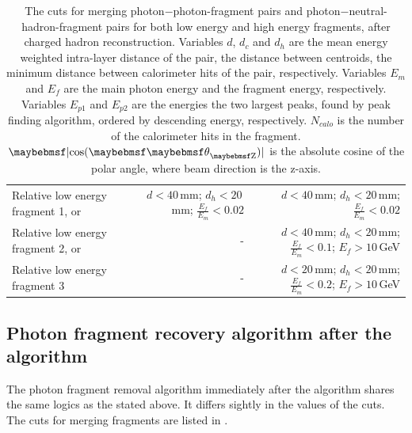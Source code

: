 \begin{table}[htbp]
\begin{tabular}{l  r  r }
\multicolumn{1}{L{0.3\textwidth}}{Relative low energy fragment 1, or} & \multicolumn{1}{R{0.3\textwidth}}{$d < 40$\,mm; $d_h < 20$\,mm; $\frac{E_f}{E_m} < 0.02$} & \multicolumn{1}{R{0.3\textwidth}}{$d < 40$\,mm; $d_h < 20$\,mm; $\frac{E_f}{E_m} < 0.02$} \\
\multicolumn{1}{L{0.3\textwidth}}{Relative low energy fragment 2, or} & \multicolumn{1}{R{0.3\textwidth}}{-}  & \multicolumn{1}{R{0.3\textwidth}}{$d < 40$\,mm; $d_h < 20$\,mm; $\frac{E_f}{E_m} < 0.1$; $E_f > 10$\,GeV} \\
\multicolumn{1}{L{0.3\textwidth}}{Relative low energy fragment 3} & \multicolumn{1}{R{0.3\textwidth}}{-}  & \multicolumn{1}{R{0.3\textwidth}}{$d < 20$\,mm; $d_h < 20$\,mm; $\frac{E_f}{E_m} < 0.2$; $E_f > 10$\,GeV} \\
\hline
\hline
\end{tabular}

\caption[The cuts for photon fragment removal algorithm in the \ECAL.]%
{The cuts for merging photon$-$photon-fragment pairs and photon$-$neutral-hadron-fragment pairs for both low energy and high energy fragments, after charged hadron reconstruction. Variables $d$, $d_c$ and $d_h$ are the mean energy weighted intra-layer distance of the pair, the distance between centroids, the minimum distance between calorimeter hits of the pair, respectively. Variables $E_m$ and $E_f$ are the main photon energy and the fragment energy, respectively. Variables $E_{p1}$ and $E_{p2}$ are the energies the two largest peaks, found by peak finding algorithm, ordered by descending energy, respectively. $N_{calo}$ is the number of the calorimeter hits in the fragment. $\absCosTheta$ is the absolute cosine of the polar angle, where beam direction is the z-axis. }
\label{tab:photonFragRemovalCuts}
\end{table}

\subsection{Photon fragment recovery algorithm after the \PhotonReconstruction algorithm}

The photon fragment removal algorithm immediately after the \PhotonReconstruction algorithm shares the same logics as the stated above. It differs sightly in the values of the cuts. The cuts for merging fragments are listed in .



